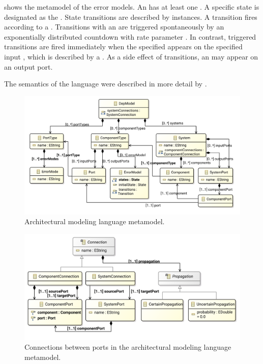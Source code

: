  shows the metamodel of the error models. An  has at least one . A specific state is designated as the . State transitions are described by  instances. A transition fires according to a . Transitions with an  are triggered spontaneously by an exponentially distributed countdown with rate parameter . In contrast,  triggered transitions are fired immediately when the specified  appears on the specified input , which is described by a . As a side effect of transitions, an  may appear on an output port.

The semantics of the language were described in more detail by \citet[Chapter~4]{Ecsedi16architecture}.

\begin{figure}
  \centering
  \includegraphics[scale=0.825]{figures/depmodel_metamodel}
  \caption{Architectural modeling language metamodel.}
  \label{fig:architecture:metamodel}
\end{figure}

\begin{figure}
  \centering
  \includegraphics[scale=0.825]{figures/depmodel_metamodel_connections}
  \caption{Connections between ports in the architectural modeling language metamodel.}
  \label{fig:architecture:connections}
\end{figure}

